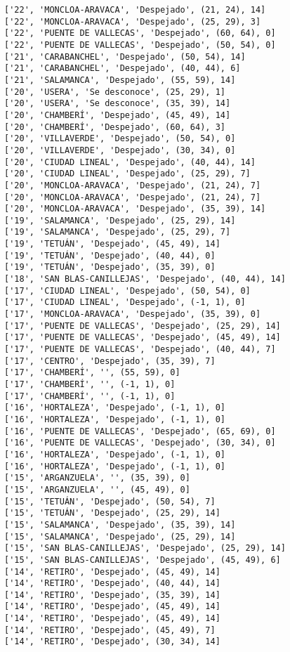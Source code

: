 \documentclass[11pt]{article}
\begin{document}
\begin{Verbatim}[commandchars=\\\{\}]
['22', 'MONCLOA-ARAVACA', 'Despejado', (21, 24), 14]
['22', 'MONCLOA-ARAVACA', 'Despejado', (25, 29), 3]
['22', 'PUENTE DE VALLECAS', 'Despejado', (60, 64), 0]
['22', 'PUENTE DE VALLECAS', 'Despejado', (50, 54), 0]
['21', 'CARABANCHEL', 'Despejado', (50, 54), 14]
['21', 'CARABANCHEL', 'Despejado', (40, 44), 6]
['21', 'SALAMANCA', 'Despejado', (55, 59), 14]
['20', 'USERA', 'Se desconoce', (25, 29), 1]
['20', 'USERA', 'Se desconoce', (35, 39), 14]
['20', 'CHAMBERÍ', 'Despejado', (45, 49), 14]
['20', 'CHAMBERÍ', 'Despejado', (60, 64), 3]
['20', 'VILLAVERDE', 'Despejado', (50, 54), 0]
['20', 'VILLAVERDE', 'Despejado', (30, 34), 0]
['20', 'CIUDAD LINEAL', 'Despejado', (40, 44), 14]
['20', 'CIUDAD LINEAL', 'Despejado', (25, 29), 7]
['20', 'MONCLOA-ARAVACA', 'Despejado', (21, 24), 7]
['20', 'MONCLOA-ARAVACA', 'Despejado', (21, 24), 7]
['20', 'MONCLOA-ARAVACA', 'Despejado', (35, 39), 14]
['19', 'SALAMANCA', 'Despejado', (25, 29), 14]
['19', 'SALAMANCA', 'Despejado', (25, 29), 7]
['19', 'TETUÁN', 'Despejado', (45, 49), 14]
['19', 'TETUÁN', 'Despejado', (40, 44), 0]
['19', 'TETUÁN', 'Despejado', (35, 39), 0]
['18', 'SAN BLAS-CANILLEJAS', 'Despejado', (40, 44), 14]
['17', 'CIUDAD LINEAL', 'Despejado', (50, 54), 0]
['17', 'CIUDAD LINEAL', 'Despejado', (-1, 1), 0]
['17', 'MONCLOA-ARAVACA', 'Despejado', (35, 39), 0]
['17', 'PUENTE DE VALLECAS', 'Despejado', (25, 29), 14]
['17', 'PUENTE DE VALLECAS', 'Despejado', (45, 49), 14]
['17', 'PUENTE DE VALLECAS', 'Despejado', (40, 44), 7]
['17', 'CENTRO', 'Despejado', (35, 39), 7]
['17', 'CHAMBERÍ', '', (55, 59), 0]
['17', 'CHAMBERÍ', '', (-1, 1), 0]
['17', 'CHAMBERÍ', '', (-1, 1), 0]
['16', 'HORTALEZA', 'Despejado', (-1, 1), 0]
['16', 'HORTALEZA', 'Despejado', (-1, 1), 0]
['16', 'PUENTE DE VALLECAS', 'Despejado', (65, 69), 0]
['16', 'PUENTE DE VALLECAS', 'Despejado', (30, 34), 0]
['16', 'HORTALEZA', 'Despejado', (-1, 1), 0]
['16', 'HORTALEZA', 'Despejado', (-1, 1), 0]
['15', 'ARGANZUELA', '', (35, 39), 0]
['15', 'ARGANZUELA', '', (45, 49), 0]
['15', 'TETUÁN', 'Despejado', (50, 54), 7]
['15', 'TETUÁN', 'Despejado', (25, 29), 14]
['15', 'SALAMANCA', 'Despejado', (35, 39), 14]
['15', 'SALAMANCA', 'Despejado', (25, 29), 14]
['15', 'SAN BLAS-CANILLEJAS', 'Despejado', (25, 29), 14]
['15', 'SAN BLAS-CANILLEJAS', 'Despejado', (45, 49), 6]
['14', 'RETIRO', 'Despejado', (45, 49), 14]
['14', 'RETIRO', 'Despejado', (40, 44), 14]
['14', 'RETIRO', 'Despejado', (35, 39), 14]
['14', 'RETIRO', 'Despejado', (45, 49), 14]
['14', 'RETIRO', 'Despejado', (45, 49), 14]
['14', 'RETIRO', 'Despejado', (45, 49), 7]
['14', 'RETIRO', 'Despejado', (30, 34), 14]

\end{Verbatim}
\end{document}

